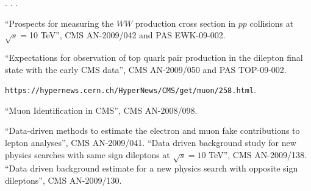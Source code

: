 \begin{thebibliography}{99}

.
.
.

 {``Prospects for measuring the $WW$ production cross section in $pp$ collisions at $\sqrt s = $10 TeV''}, CMS AN-2009/042 and PAS EWK-09-002.

 {``Expectations for observation of top quark pair production in the dilepton final state with the early CMS data''}, CMS AN-2009/050 and PAS TOP-09-002.

 {\tt https://hypernews.cern.ch/HyperNews/CMS/get/muon/258.html}.

 {``Muon Identification in CMS''}, CMS AN-2008/098.

 {``Data-driven methods to estimate the electron and muon fake contributions to lepton analyses''}, CMS AN-2009/041.
 {``Data driven background study for new physics searches with same sign dileptons at $\sqrt{s} = 10 $ TeV''}, CMS AN-2009/138.
 {``Data driven background estimate for a new physics search with opposite sign dileptons''}, CMS AN-2009/130.


\end{thebibliography}








